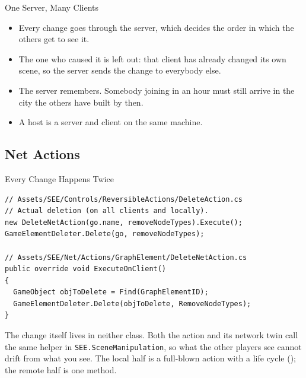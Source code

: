 \begin{frame}{One Server, Many Clients}
\begin{center}
  \end{center}

  \begin{itemize}
    \item Every change goes through the server, which decides the order in
      which the others get to see it.
    \item The one who caused it is left out: that client has already changed
      its own scene, so the server sends the change to everybody else.
    \item The server remembers. Somebody joining in an hour must still arrive
      in the city the others have built by then.
    \item A host is a server and client on the same machine.
  \end{itemize}
\end{frame}

\subsection{Net Actions}

\begin{frame}[fragile]{Every Change Happens Twice}
  \begin{lstlisting}[basicstyle=\scriptsize\ttfamily]
// Assets/SEE/Controls/ReversibleActions/DeleteAction.cs
// Actual deletion (on all clients and locally).
new DeleteNetAction(go.name, removeNodeTypes).Execute();
GameElementDeleter.Delete(go, removeNodeTypes);

// Assets/SEE/Net/Actions/GraphElement/DeleteNetAction.cs
public override void ExecuteOnClient()
{
  GameObject objToDelete = Find(GraphElementID);
  GameElementDeleter.Delete(objToDelete, RemoveNodeTypes);
}
  \end{lstlisting}
  \vspace{1ex}

  The change itself lives in neither class. Both the action and its network
  twin call the same helper in \texttt{SEE.SceneManipulation}, so what
  the other players see cannot drift from what you see. The local half is a
  full-blown action with a life cycle (); the remote
  half is one method.
\end{frame}

